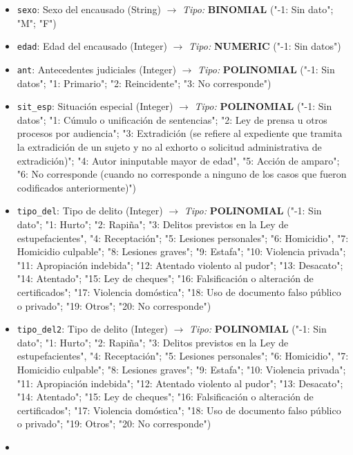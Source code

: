 \documentclass[11pt]{article}
\begin{document}
\begin{itemize}
{  Art. 59, Ley 14412"; "11: Sentencia Interlocutoria - Remisión")}
\item
  \texttt{sexo}: Sexo del encausado (String) \(\rightarrow\)
  \emph{Tipo:} {\textbf{BINOMIAL} ("-1: Sin dato"; "M"; "F")}
\item
  \texttt{edad}: Edad del encausado (Integer) \(\rightarrow\)
  \emph{Tipo:} {\textbf{NUMERIC} ("-1: Sin datos")}
\item
  \texttt{ant}: Antecedentes judiciales (Integer) \(\rightarrow\)
  \emph{Tipo:} {\textbf{POLINOMIAL} ("-1: Sin datos"; "1: Primario"; "2:
  Reincidente"; "3: No corresponde")}
\item
  \texttt{sit\_esp}: Situación especial (Integer) \(\rightarrow\)
  \emph{Tipo:} {\textbf{POLINOMIAL} ("-1: Sin datos"; "1: Cúmulo o
  unificación de sentencias"; "2: Ley de prensa u otros procesos por
  audiencia"; "3: Extradición (se refiere al expediente que tramita la
  extradición de un sujeto y no al exhorto o solicitud administrativa de
  extradición)"; "4: Autor ininputable mayor de edad", "5: Acción de
  amparo"; "6: No corresponde (cuando no corresponde a ninguno de los
  casos que fueron codificados anteriormente)")}
\item
  \texttt{tipo\_del}: Tipo de delito (Integer) \(\rightarrow\)
  \emph{Tipo:} {\textbf{POLINOMIAL} ("-1: Sin dato"; "1: Hurto"; "2:
  Rapiña"; "3: Delitos previstos en la Ley de estupefacientes", "4:
  Receptación"; "5: Lesiones personales"; "6: Homicidio", "7: Homicidio
  culpable"; "8: Lesiones graves"; "9: Estafa"; "10: Violencia privada";
  "11: Apropiación indebida"; "12: Atentado violento al pudor"; "13:
  Desacato"; "14: Atentado"; "15: Ley de cheques"; "16: Falsificación o
  alteración de certificados"; "17: Violencia domóstica"; "18: Uso de
  documento falso público o privado"; "19: Otros"; "20: No
  corresponde")}
\item
  \texttt{tipo\_del2}: Tipo de delito (Integer) \(\rightarrow\)
  \emph{Tipo:} {\textbf{POLINOMIAL} ("-1: Sin dato"; "1: Hurto"; "2:
  Rapiña"; "3: Delitos previstos en la Ley de estupefacientes", "4:
  Receptación"; "5: Lesiones personales"; "6: Homicidio", "7: Homicidio
  culpable"; "8: Lesiones graves"; "9: Estafa"; "10: Violencia privada";
  "11: Apropiación indebida"; "12: Atentado violento al pudor"; "13:
  Desacato"; "14: Atentado"; "15: Ley de cheques"; "16: Falsificación o
  alteración de certificados"; "17: Violencia domóstica"; "18: Uso de
  documento falso público o privado"; "19: Otros"; "20: No
  corresponde")}
\item

\end{itemize}
\end{document}

